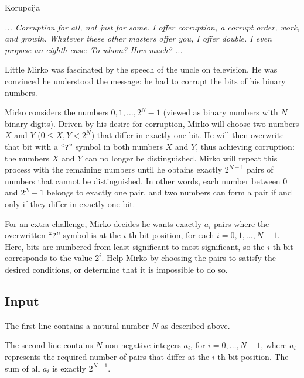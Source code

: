 \begin{statement}[
  problempoints=100,
  timelimit=1 second,
  memorylimit=512 MiB,
]{Korupcija}

\textit{... Corruption for all, not just for some. I offer corruption, a corrupt order, work, and growth. 
Whatever these other masters offer you, I offer double.  
I even propose an eighth case: To whom? How much? ...}

Little Mirko was fascinated by the speech of the uncle on television.  
He was convinced he understood the message: he had to corrupt the bits of his binary numbers.

Mirko considers the numbers $0, 1, \dots, 2^N-1$ (viewed as binary numbers with $N$ binary digits).  
Driven by his desire for corruption, Mirko will choose two numbers $X$ and $Y$ ($0 \leq X, Y < 2^N$) 
that differ in exactly one bit.  
He will then overwrite that bit with a “\texttt{?}” symbol in both numbers $X$ and $Y$, 
thus achieving corruption: the numbers $X$ and $Y$ can no longer be distinguished.  
Mirko will repeat this process with the remaining numbers until he obtains 
exactly $2^{N-1}$ pairs of numbers that cannot be distinguished.  
In other words, each number between $0$ and $2^N-1$ belongs to exactly one pair, and  
two numbers can form a pair if and only if they differ in exactly one bit.

For an extra challenge, Mirko decides he wants exactly $a_i$ pairs 
where the overwritten “\texttt{?}” symbol is at the $i$-th bit position, 
for each $i = 0, 1, \dots, N-1$.  
Here, bits are numbered from least significant to most significant, so the $i$-th bit 
corresponds to the value $2^i$.  
Help Mirko by choosing the pairs to satisfy the desired conditions, or determine 
that it is impossible to do so.

\subsection*{Input}

The first line contains a natural number $N$ as described above.

The second line contains $N$ non-negative integers $a_i$, for $i = 0, \dots, N-1$,  
where $a_i$ represents the required number of pairs that differ at the $i$-th bit position.  
The sum of all $a_i$ is exactly $2^{N-1}$.


\end{statement}
